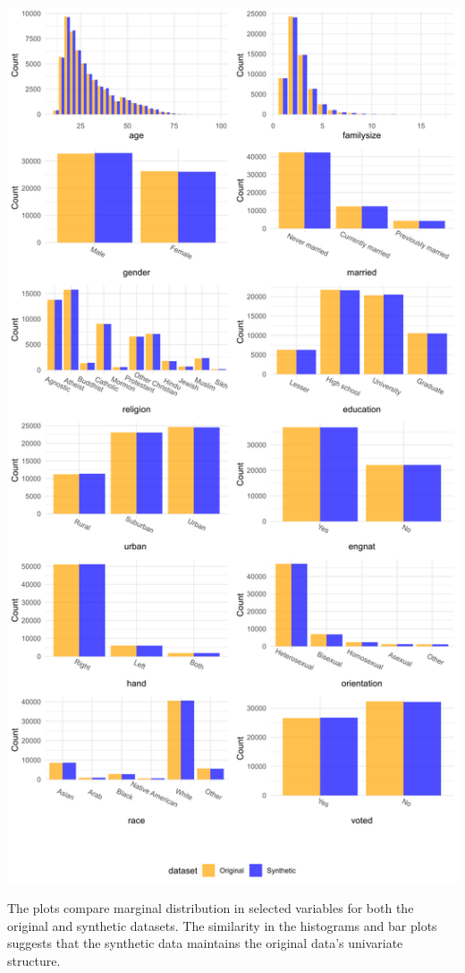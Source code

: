 \documentclass[a0,portrait]{a0poster}
\begin{document}
\begin{multicols}{3}
\includegraphics[width=1\linewidth]{Poster TEX/figures/marginal_all_v6.png}

\vspace{0.5cm}

The plots compare marginal distribution in selected variables for both the original and synthetic datasets. The similarity in the histograms and bar plots suggests that the synthetic data maintains the original data's univariate structure.


\end{multicols}
\end{document}
